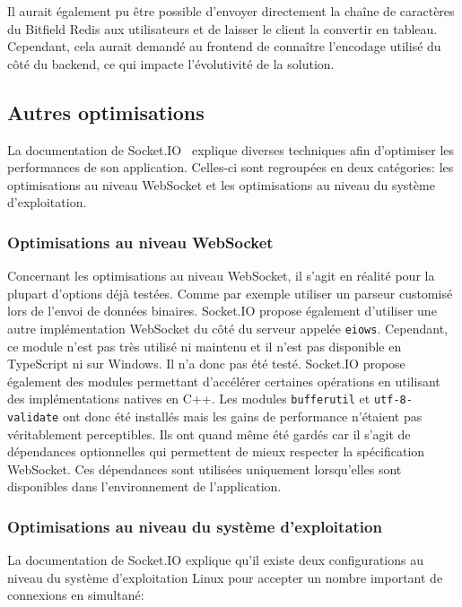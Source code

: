 Il aurait également pu être possible d'envoyer directement la chaîne de caractères du Bitfield Redis aux utilisateurs et de laisser le client la convertir en tableau. Cependant, cela aurait demandé au frontend de connaître l'encodage utilisé du côté du backend, ce qui impacte l'évolutivité de la solution.

\subsection{Autres optimisations}

La documentation de Socket.IO~\cite{socket-io-performance-tuning} explique diverses techniques afin d'optimiser les performances de son application. Celles-ci sont regroupées en deux catégories: les optimisations au niveau WebSocket et les optimisations au niveau du système d'exploitation.

\subsubsection{Optimisations au niveau WebSocket}

Concernant les optimisations au niveau WebSocket, il s'agit en réalité pour la plupart d'options déjà testées. Comme par exemple utiliser un parseur customisé lors de l'envoi de données binaires. Socket.IO propose également d'utiliser une autre implémentation WebSocket du côté du serveur appelée \texttt{eiows}. Cependant, ce module n'est pas très utilisé ni maintenu et il n'est pas disponible en TypeScript ni sur Windows. Il n'a donc pas été testé. Socket.IO propose également des modules permettant d'accélérer certaines opérations en utilisant des implémentations natives en C++. Les modules \texttt{bufferutil} et \texttt{utf-8-validate} ont donc été installés mais les gains de performance n'étaient pas véritablement perceptibles. Ils ont quand même été gardés car il s'agit de dépendances optionnelles qui permettent de mieux respecter la spécification WebSocket. Ces dépendances sont utilisées uniquement lorsqu'elles sont disponibles dans l'environnement de l'application.

\subsubsection{Optimisations au niveau du système d'exploitation}

La documentation de Socket.IO explique qu'il existe deux configurations au niveau du système d'exploitation Linux pour accepter un nombre important de connexions en simultané:

